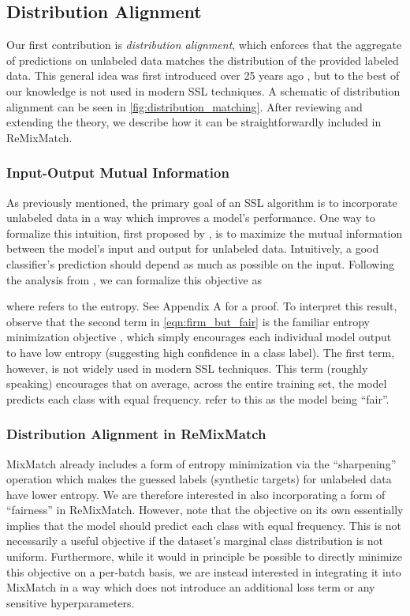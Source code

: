 \documentclass{article} \usepackage{iclr2020_conference,times}
\begin{document}
\subsection{Distribution Alignment}

Our first contribution is \textit{distribution alignment}, which enforces that the aggregate of predictions on unlabeled data matches the distribution of the provided labeled data.
This general idea was first introduced over 25 years ago \citep{bridle1992unsupervised}, but to the best of our knowledge is not used in modern SSL techniques.
A schematic of distribution alignment can be seen in \cref{fig:distribution_matching}.
After reviewing and extending the theory, we describe how it can be straightforwardly included in ReMixMatch.

\subsubsection{Input-Output Mutual Information}

As previously mentioned, the primary goal of
an SSL algorithm is to incorporate unlabeled data in a way which improves a model's performance.
One way to formalize this intuition, first proposed by \cite{bridle1992unsupervised},
is to maximize the mutual information between the model's input and output for unlabeled data.
Intuitively, a good classifier's prediction should depend as much as possible on the input.
Following the analysis from \cite{bridle1992unsupervised}, we can formalize this objective as


where  refers to the entropy. See Appendix A for a proof.
To interpret this result, observe that 
the second term in \cref{eqn:firm_but_fair} is the familiar entropy minimization objective \citep{grandvalet2005semi}, which simply encourages each individual model output to have low entropy (suggesting high confidence in a class label).
The first term, however, is not widely used in modern SSL techniques.
This term (roughly speaking) encourages that on average, 
across the entire training set, the model predicts each class with equal frequency.
\cite{bridle1992unsupervised} refer to this as the model being ``fair''.


\subsubsection{Distribution Alignment in ReMixMatch}

MixMatch already includes a form of entropy minimization via the ``sharpening'' operation which makes the guessed labels (synthetic targets) for unlabeled data have lower entropy.
We are therefore interested in also incorporating a form of ``fairness'' in ReMixMatch.
However, note that the objective  on its own essentially implies that the model should predict each class with equal frequency.
This is not necessarily a useful objective if the dataset's marginal class distribution  is not uniform.
Furthermore, while it would in principle be possible to directly minimize this objective on a per-batch basis, we are instead interested in integrating it into MixMatch in a way which does not introduce an additional loss term or any sensitive hyperparameters.
\end{document}
